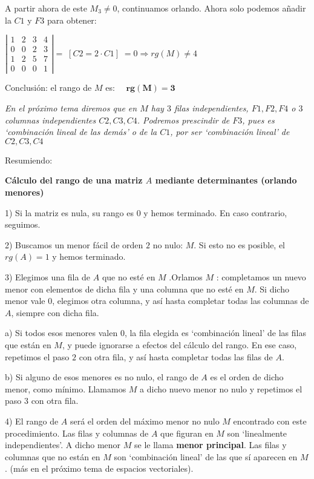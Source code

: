 \begin{ejem}
A partir ahora de este $M_3 \neq 0$, continuamos orlando. Ahora solo podemos añadir la $C1$ y $F3$ para obtener:

$\left| \begin{matrix} 1& \boxed{2} & \boxed{3} & \boxed{4} \\ 0 & \boxed{0} & \boxed{2} & \boxed{3} \\ 1 & 2 & 5 & 7 \\ 0 & \boxed{0} & \boxed{0} & \boxed{1}  \end{matrix} \right| = \; [C2=2\cdot C1] \; = 0 \Rightarrow rg(M) \neq 4$

Conclusión: el rango de $M$ es: $\quad \boldsymbol{rg(M)=3}$ 

\emph{\textcolor{gris}{En el próximo tema diremos que en $M$ hay $3$ filas independientes, $F1, F2, F4$ o $3$ columnas independientes $C2, C3, C4$. Podremos prescindir de $F3$, pues es `combinación lineal de las demás' o de la $C1$, por ser `combinación lineal' de  $C2, C3, C4$}}
	
\end{ejem}



Resumiendo:

\textbf{Cálculo del rango de una matriz $A$ mediante determinantes (orlando menores)}

1) Si la matriz es nula, su rango es $0$ y hemos terminado. En caso contrario, seguimos.

2) Buscamos un menor fácil de orden $2$ no nulo: $M$. Si esto no es posible, el $rg(A)=1$ y hemos terminado.

3) Elegimos una fila de $A$ que no esté en $M$ .Orlamos $M$ : completamos un nuevo menor con elementos de dicha fila y una columna que no esté en $M$. Si dicho menor vale $0$, elegimos otra columna, y así hasta completar todas las columnas de $A$, siempre con dicha fila.

\hspace{5mm} a) Si todos esos menores valen $0$, la fila elegida es `combinación lineal' de las filas que están en $M$, y puede ignorarse a efectos del cálculo del rango. En ese caso, repetimos el paso $2$ con otra fila, y así hasta completar todas las filas de $A$.

\hspace{5mm}  b) Si alguno de esos menores es no nulo, el rango de $A$ es el orden de dicho menor, como mínimo. Llamamos $M$ a dicho nuevo menor no nulo y repetimos el
paso $3$ con otra fila.

4) El rango de $A$ será el orden del máximo menor no nulo $M$ encontrado con este procedimiento. Las filas y columnas de $A$ que figuran en $M$ son `linealmente independientes'. A dicho menor $M$ se le llama \textbf{menor principal}. Las filas y columnas que no están en $M$ son `combinación lineal' de las que sí aparecen en $M$. (más en el próximo tema de espacios vectoriales).

